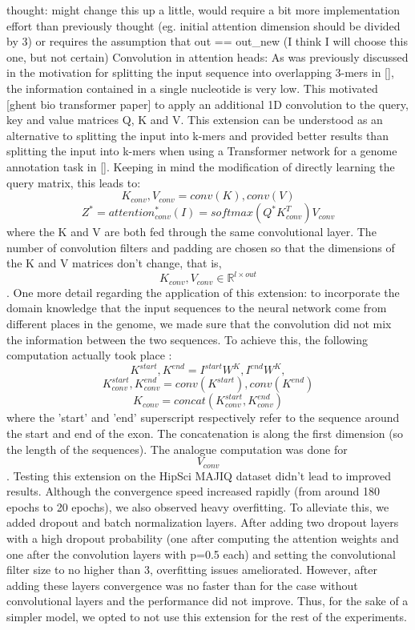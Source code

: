 thought: might change this up a little, would require a bit more implementation effort than previously thought (eg. initial attention dimension should be divided by 3) or requires the assumption that out == out_new (I think I will choose this one, but not certain)
Convolution in attention heads:
As was previously discussed in the motivation for splitting the input sequence into overlapping 3-mers in [], the information contained in a single nucleotide is very low. This motivated [ghent bio transformer paper] to apply an additional 1D convolution to the query, key and value matrices Q, K and V. This extension can be understood as an alternative to splitting the input into k-mers and provided better results than splitting the input into k-mers when using a Transformer network for a genome annotation task in [].
Keeping in mind the modification of directly learning the query matrix, this leads to:
$$K_{conv}, V_{conv} = conv(K), conv(V)$$
$$Z^* = {attention}_{conv}^*(I) = softmax({Q}^*K_{conv}^T)V_{conv}$$
where the K and V are both fed through the same convolutional layer.
The number of convolution filters and padding are chosen so that the dimensions of the K and V matrices don't change, that is, $$K_{conv}, V_{conv} \in \mathbb{R}^{l \times out}$$.
One more detail regarding the application of this extension: to incorporate the domain knowledge that the input sequences to the neural network come from different places in the genome, we made sure that the convolution did not mix the information between the two sequences. To achieve this, the following computation actually took place :
$$K^{start}, K^{end} = I^{start}W^K, I^{end}W^K,$$
$$K^{start}_{conv}, K^{end}_{conv} = conv(K^{start}), conv(K^{end})$$
$$K_{conv} = concat(K^{start}_{conv}, K^{end}_{conv})$$
where the 'start' and 'end' superscript respectively refer to the sequence around the start and end of the exon. The concatenation is along the first dimension (so the length of the sequences). The analogue computation was done for $$V_{conv}$$.
Testing this extension on the HipSci MAJIQ dataset didn't lead to improved results. Although the convergence speed increased rapidly (from around 180 epochs to 20 epochs), we also observed heavy overfitting. To alleviate this, we added dropout and batch normalization layers. After adding two dropout layers with a high dropout probability (one after computing the attention weights and one after the convolution layers with p=0.5 each) and setting the convolutional filter size to no higher than 3, overfitting issues ameliorated. However, after adding these layers convergence was no faster than for the case without convolutional layers and the performance did not improve. Thus, for the sake of a simpler model, we opted to not use this extension for the rest of the experiments.
